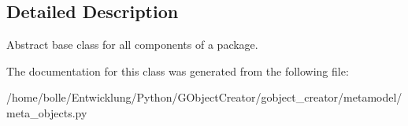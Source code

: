 \subsection{Detailed Description}
Abstract base class for all components of a package. 

The documentation for this class was generated from the following file:\begin{DoxyCompactItemize}
\item 
/home/bolle/Entwicklung/Python/GObjectCreator/gobject\_\-creator/metamodel/meta\_\-objects.py\end{DoxyCompactItemize}
